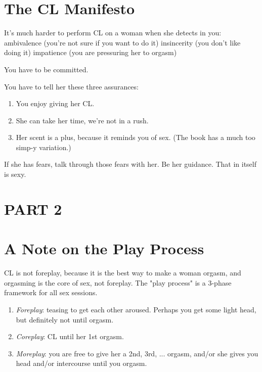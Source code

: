 \section{The CL Manifesto}
\begin{outline}
\1 It's much harder to perform CL on a woman when she detects in you:
	\2 ambivalence (you're not sure if you want to do it)
	\2 insincerity (you don't like doing it)
	\2 impatience (you are pressuring her to orgasm)
	
\1 You have to be committed.

\1 You have to tell her these three assurances:
\begin{enumerate}
	\item You enjoy giving her CL.
	\item She can take her time, we're not in a rush.
	\item Her scent is a plus, because it reminds you of sex. (The book has a much too simp-y variation.)
\end{enumerate}

\1 If she has fears, talk through those fears with her. Be her guidance. That in itself is sexy.
\end{outline}


\section*{PART 2}
\section{A Note on the Play Process}
\begin{outline}
\1 CL is not foreplay, because it is the best way to make a woman orgasm, and orgasming is the core of sex, not foreplay.
\1 The "play process" is a 3-phase framework for all sex sessions.
\begin{enumerate}
	\item \emph{Foreplay}: teasing to get each other aroused. Perhaps you get some light head, but definitely not until orgasm.
	\item \emph{Coreplay}: CL until her 1st orgasm.
	\item \emph{Moreplay}: you are free to give her a 2nd, 3rd, ... orgasm, and/or she gives you head and/or intercourse until you orgasm.
\end{enumerate}
\end{outline}

